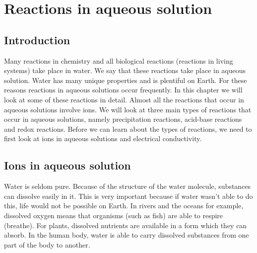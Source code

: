          \chapter{Reactions in aqueous solution} \label{chap:rxnsaq}
    \setcounter{figure}{1}
    \setcounter{subfigure}{1}
    \label{4c7ba3bfe702f176850b0d58ba743465}
         \section{Introduction}
    \nopagebreak
\label{m38720*eip-56}
            \label{m38720*eip-869}Many reactions in chemistry and all biological reactions (reactions in living systems) take place in water. We say that these reactions take place in aqueous solution. Water has many unique properties and is plentiful on Earth. For these reasons reactions in aqueous solutions occur frequently. In this chapter we will look at some of these reactions in detail. Almost all the reactions that occur in aqueous solutions involve ions. We will look at three main types of reactions that occur in aqueous solutions, namely precipitation reactions, acid-base reactions and redox reactions. Before we can learn about the types of reactions, we need to first look at ions in aqueous solutions and electrical conductivity.
\par \label{m38720*cid6}
            \section{Ions in aqueous solution}
            \nopagebreak
      \label{m38720*id335294}Water is seldom pure. Because of the structure of the water molecule, substances can dissolve easily in it. This is very important because if water wasn't able to do this, life would not be possible on Earth. In rivers and the oceans for example, dissolved oxygen means that organisms (such as fish) are able to respire (breathe). For plants, dissolved nutrients are available in a form which they can absorb. In the human body, water is able to carry dissolved substances from one part of the body to another.\par 
      \label{m38720*uid19}
